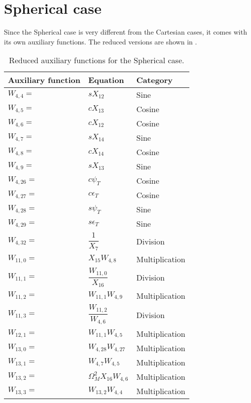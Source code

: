 \section{Spherical case}
\label{sec:spherApp}
Since the Spherical case is very different from the Cartesian cases, it comes with its own auxiliary functions. The reduced versions are shown in .

\begin{longtable}{|p{1.5cm}|l|p{2cm}|}
\caption{Reduced auxiliary functions for the Spherical case.}
\label{tab:auxFunc3}
\endfirsthead
\endhead
\hline
\textbf{Auxiliary function} & \textbf{Equation} & \textbf{Category}  \\ \hline \hline
\hline 
$W_{4,4}=$ & $ s X_{12} $ & Sine \\ \hline 
$W_{4,5}=$ & $ c X_{13} $ & Cosine \\ \hline 
$W_{4,6}=$ & $ c X_{12} $ & Cosine \\ \hline 
$W_{4,7}=$ & $ s X_{14} $ & Sine \\ \hline 
$W_{4,8}=$ & $ c X_{14} $ & Cosine \\ \hline 
$W_{4,9}=$ & $ s X_{13} $ & Sine \\ \hline 
$W_{4,26}=$ & $ c \psi_{T} $ & Cosine \\ \hline 
$W_{4,27}=$ & $ c \epsilon_{T} $ & Cosine \\ \hline 
$W_{4,28}=$ & $ s \psi_{T} $ & Sine \\ \hline 
$W_{4,29}=$ & $ s \epsilon_{T} $ & Sine \\ \hline 
$W_{4,32}=$ & $ \dfrac{1}{X_{7}} $ & Division \\ \hline 
$W_{11,0}=$ & $ X_{15}W_{4,8} $ & Multiplication \\ \hline
$W_{11,1}=$ & $ \dfrac{W_{11,0}}{X_{16}} $ & Division \\ \hline
$W_{11,2}=$ & $ W_{11,1}W_{4,9} $ & Multiplication \\ \hline
$W_{11,3}=$ & $ \dfrac{W_{11,2}}{W_{4,6}} $ & Division \\ \hline
$W_{12,1}=$ & $ W_{11,1}W_{4,5} $ & Multiplication \\ \hline
$W_{13,0}=$ & $ W_{4,28}W_{4,27} $ & Multiplication \\ \hline
$W_{13,1}=$ & $ W_{4,7}W_{4,5} $ & Multiplication \\ \hline
$W_{13,2}=$ & $ \Omega_{M}^{2} X_{16} W_{4,6} $ & Multiplication \\ \hline
$W_{13,3}=$ & $ W_{13,2}W_{4,4} $ & Multiplication \\ \hline

\end{longtable}
